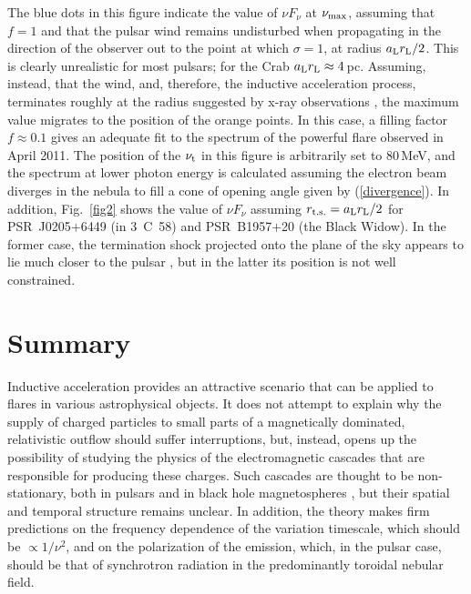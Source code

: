 \documentclass{PoS}
\begin{document}
The blue dots in this figure indicate the value of $\nu F_\nu$ at
$\nu_{\rm max}$, assuming that $f=1$ and that the pulsar wind remains
undisturbed when propagating in the direction of the observer out to
the point at which $\sigma=1$, at radius $a_{\rm L}r_{\rm L}/2$. 
This is clearly unrealistic for most pulsars; for the Crab $a_{\rm L}r_{\rm L}\approx 4\,$pc. 
Assuming, instead, that the wind, and, therefore, the
inductive acceleration process, terminates roughly at the radius
suggested by x-ray observations \cite{kargaltsevpavlov08}, the maximum
value migrates to the position of the orange points. In this case, a
filling factor $f\approx0.1$ gives an adequate fit to the spectrum of
the powerful flare observed in April 2011\cite{buehleretal12}. The
position of the $\nu_{\rm t}$ in this figure is arbitrarily set to
$80\,$MeV, and the spectrum at lower photon energy is calculated
assuming the electron beam diverges in the nebula to fill a cone of
opening angle given by (\ref{divergence}).  In addition,
Fig.~\ref{fig2} shows the value of $\nu F_\nu$ assuming $r_{\rm
  t.s.}=a_{\rm L}r_{\rm L}/2$ for PSR~J0205$+$6449 (in 3~C~58) and
PSR~B1957$+$20 (the Black Widow). In the former case, the termination
shock projected onto the plane of the sky appears to lie much closer
to the pulsar \cite{kargaltsevpavlov08}, but in the latter its
position is not well constrained.

\section{Summary}
Inductive acceleration provides an attractive scenario
that can be applied to flares in various astrophysical objects.
It does not attempt to explain 
why the supply of charged particles to small parts of a
magnetically dominated, relativistic outflow should suffer
interruptions, but, instead, opens up the possibility of 
studying the physics of
the electromagnetic cascades that are responsible for producing these
charges.  Such cascades are thought to be
non-stationary, both in pulsars and in black hole magnetospheres
\cite{ceruttibeloborodov17,levinsonsegev17}, but their 
spatial and temporal structure remains unclear. In addition, the theory makes
firm predictions on the frequency dependence of the variation timescale,
which should be $\propto 1/\nu^2$, and on 
the polarization of the emission, which, in the pulsar case, should be that 
of synchrotron radiation in the predominantly toroidal nebular field.
\end{document}
